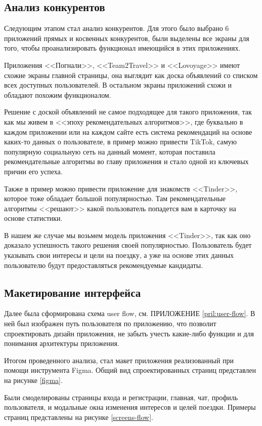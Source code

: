 \subsection{Анализ конкурентов}

Следующим этапом стал анализ конкурентов. Для этого было выбрано 6 приложений прямых и косвенных конкурентов, были выделены все экраны для того, чтобы проанализировать функционал имеющийся в этих приложениях.


Приложения <<Погнали>>, <<Team2Travel>> и <<Lovoyage>> имеют схожие экраны  главной страницы, она выглядит как доска объявлений со списком всех доступных пользователей. В остальном экраны приложений схожи и обладают похожим функционалом.

Решение с доской объявлений не самое подходящее для такого приложения, так как мы живем в <<эпоху рекомендательных алгоритмов>>, где буквально в каждом приложении или на каждом сайте есть система рекомендаций на основе каких-то данных о пользователе, в пример можно привести TikTok, самую популярную социальную сеть на данный момент, которая поставила рекомендательные алгоритмы во главу приложения и стало одной из ключевых причин его успеха.

Также в пример можно привести приложение для знакомств <<Tinder>>, которое тоже обладает большой популярностью. Там рекомендательные алгоритмы <<решают>> какой пользователь попадется вам в карточку на основе статистики.

В нашем же случае мы возьмем модель приложения <<Tinder>>, так как оно доказало успешность такого решения своей популярностью. Пользователь будет указывать свои интересы и цели на поездку, а уже на основе этих данных пользователю будут предоставляться рекомендуемые кандидаты.

\subsection{Макетирование интерфейса}

Далее была сформирована схема user flow, см. ПРИЛОЖЕНИЕ \ref{pril:user-flow}. В ней был изображен путь пользователя по приложению, что позволит спроектировать дизайн приложения, не забыть учесть какие-либо функции и для понимания архитектуры приложения.

Итогом проведенного анализа, стал макет приложения реализованный при помощи инструмента Figma. Общий вид спроектированных страниц представлен на рисунке \ref{figma}.


Были смоделированы страницы входа и регистрации, главная, чат, профиль пользователя, и модальные окна изменения интересов и целей поездки. Примеры страниц представлены на рисунке \ref{screens-flow}.

